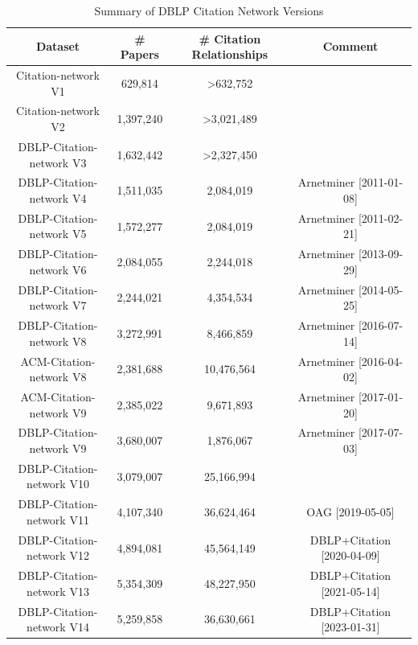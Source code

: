 \documentclass[11pt]{article}
\begin{document}
\begin{table}[h!]
	\centering
	\begin{tabular}{|c|c|c|c|}
		\hline
		\textbf{Dataset}         & \textbf{\# Papers} & \textbf{\# Citation Relationships} & \textbf{Comment}           \\
		\hline
		Citation-network V1       & 629,814            & >632,752                           &                            \\ \hline
		Citation-network V2       & 1,397,240          & >3,021,489                         &                            \\ \hline
		DBLP-Citation-network V3  & 1,632,442          & >2,327,450                         &                            \\ \hline
		DBLP-Citation-network V4  & 1,511,035          & 2,084,019                          & Arnetminer [2011-01-08]    \\ \hline
		DBLP-Citation-network V5  & 1,572,277          & 2,084,019                          & Arnetminer [2011-02-21]    \\ \hline
		DBLP-Citation-network V6  & 2,084,055          & 2,244,018                          & Arnetminer [2013-09-29]    \\ \hline
		DBLP-Citation-network V7  & 2,244,021          & 4,354,534                          & Arnetminer [2014-05-25]    \\ \hline
		DBLP-Citation-network V8  & 3,272,991          & 8,466,859                          & Arnetminer [2016-07-14]    \\ \hline
		ACM-Citation-network V8   & 2,381,688          & 10,476,564                         & Arnetminer [2016-04-02]    \\ \hline
		ACM-Citation-network V9   & 2,385,022          & 9,671,893                          & Arnetminer [2017-01-20]    \\ \hline
		DBLP-Citation-network V9  & 3,680,007          & 1,876,067                          & Arnetminer [2017-07-03]    \\ \hline
		DBLP-Citation-network V10 & 3,079,007          & 25,166,994                         &                            \\ \hline
		DBLP-Citation-network V11 & 4,107,340          & 36,624,464                         & OAG [2019-05-05]           \\ \hline
		DBLP-Citation-network V12 & 4,894,081          & 45,564,149                         & DBLP+Citation [2020-04-09] \\ \hline
		DBLP-Citation-network V13 & 5,354,309          & 48,227,950                         & DBLP+Citation [2021-05-14] \\ \hline
		DBLP-Citation-network V14 & 5,259,858          & 36,630,661                         & DBLP+Citation [2023-01-31] \\
		\hline
	\end{tabular}
	\caption{Summary of DBLP Citation Network Versions}
	\label{tab:dblp_citation_networks}
\end{table}
\end{document}
